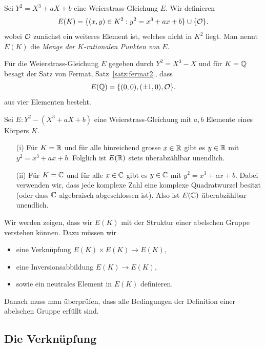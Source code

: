 \begin{definition}
  Sei $Y^2 = X^3+aX+b$ eine Weierstrass-Gleichung $E$.
  Wir definieren 
  \begin{equation*}
    E(K) = \{(x,y) \in K^2 : y^2 = x^3 + ax+b\} \cup \{{\mathcal O}\}.
  \end{equation*}
  wobei ${\mathcal O}$ zunächst ein weiteres Element ist, welches nicht in
  $K^2$ liegt. Man nennt $E(K)$ die \emph{Menge der $K$-rationalen Punkten
  von $E$}. 
\end{definition}

\begin{beispiel}
  \label{bsp:fermat}
  Für die Weierstrass-Gleichung $E$ gegeben durch $Y^2 = X^3-X$ und
  für $K={\mathbb{Q}}$ besagt der 
  Satz von Fermat, Satz~\ref{satz:fermat2}, dass
  $$ E({\mathbb{Q}}) = \{(0,0), (\pm 1,0), {\mathcal O}\} .$$
  aus vier Elementen besteht. 
\end{beispiel}


\begin{beispiel} Sei $E: Y^2-(X^3+aX+b)$ eine Weierstrass-Gleichung
  mit $a,b$ Elemente eines Körpers $K$.
  \begin{enumerate}
  \item [(i)]  Für $K={\mathbb{R}}$ und für  
    alle hinreichend grosse 
  $x\in{\mathbb{R}}$ gibt es $y\in{\mathbb{R}}$ mit $y^2 = x^3+ax+b$. Folglich ist $E({\mathbb{R}})$ stets
  überabzählbar unendlich.  
  \item[(ii)] Für $K={\mathbb{C}}$ und für alle $x\in{\mathbb{C}}$ gibt es $y\in{\mathbb{C}}$ mit
    $y^2 = x^3+ax+b$. Dabei verwenden wir, dass jede komplexe Zahl
    eine komplexe Quadratwurzel besitzt (oder dass ${\mathbb{C}}$ algebraisch
    abgeschlossen ist). Also ist $E({\mathbb{C}})$
    überabzählbar unendlich.  
  \end{enumerate}
\end{beispiel}

Wir werden zeigen, dass wir $E(K)$ mit der Struktur einer abelschen
Gruppe verstehen können. Dazu müssen wir
\begin{itemize}
\item eine Verknüpfung $E(K)\times E(K)\rightarrow E(K)$,
\item eine Inversionsabbildung $E(K)\rightarrow E(K)$,
\item sowie ein neutrales Element in $E(K)$
  definieren.
\end{itemize}
Danach muss man überprüfen, dass alle Bedingungen der Definition einer abelschen Gruppe
erfüllt sind.
  
\subsection{Die Verknüpfung}
\label{sec:verknuepfung}

